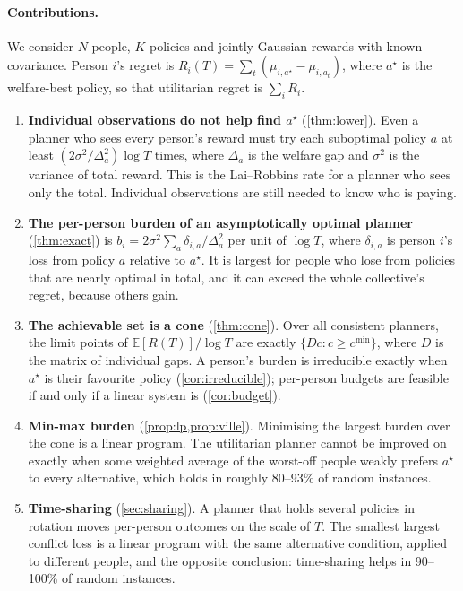 \documentclass[11pt,a4paper]{article}
\theoremstyle{plain}
\theoremstyle{definition}
\theoremstyle{remark}
\newcommand{\E}{\mathbb{E}}
\newcommand{\cmin}{c^{\min}}
\newcommand{\astar}{a^\star}
\begin{document}
\paragraph{Contributions.} We consider $N$ people, $K$ policies and jointly Gaussian rewards with known covariance. Person $i$'s regret is $R_i(T)=\sum_t(\mu_{i,\astar}-\mu_{i,a_t})$, where $\astar$ is the welfare-best policy, so that utilitarian regret is $\sum_iR_i$.
\begin{enumerate}[leftmargin=*,itemsep=2pt]
  \item \textbf{Individual observations do not help find $\astar$} (\cref{thm:lower}). Even a planner who sees every person's reward must try each suboptimal policy $a$ at least $(2\sigma^2/\Delta_a^2)\log T$ times, where $\Delta_a$ is the welfare gap and $\sigma^2$ is the variance of total reward. This is the Lai--Robbins rate for a planner who sees only the total. Individual observations are still needed to know who is paying.
  \item \textbf{The per-person burden of an asymptotically optimal planner} (\cref{thm:exact}) is $b_i=2\sigma^2\sum_{a}\delta_{i,a}/\Delta_a^2$ per unit of $\log T$, where $\delta_{i,a}$ is person $i$'s loss from policy $a$ relative to $\astar$. It is largest for people who lose from policies that are nearly optimal in total, and it can exceed the whole collective's regret, because others gain.
  \item \textbf{The achievable set is a cone} (\cref{thm:cone}). Over all consistent planners, the limit points of $\E[R(T)]/\log T$ are exactly $\{Dc: c\ge\cmin\}$, where $D$ is the matrix of individual gaps. A person's burden is irreducible exactly when $\astar$ is their favourite policy (\cref{cor:irreducible}); per-person budgets are feasible if and only if a linear system is (\cref{cor:budget}).
  \item \textbf{Min-max burden} (\cref{prop:lp,prop:ville}). Minimising the largest burden over the cone is a linear program. The utilitarian planner cannot be improved on exactly when some weighted average of the worst-off people weakly prefers $\astar$ to every alternative, which holds in roughly 80--93\% of random instances.
  \item \textbf{Time-sharing} (\cref{sec:sharing}). A planner that holds several policies in rotation moves per-person outcomes on the scale of $T$. The smallest largest conflict loss is a linear program with the same alternative condition, applied to different people, and the opposite conclusion: time-sharing helps in 90--100\% of random instances.

\end{enumerate}
\end{document}
